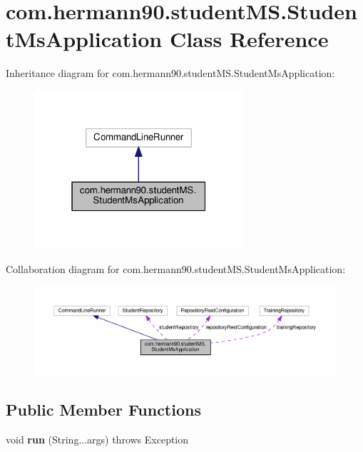\hypertarget{classcom_1_1hermann90_1_1student_m_s_1_1_student_ms_application}{}\section{com.\+hermann90.\+student\+M\+S.\+Student\+Ms\+Application Class Reference}
\label{classcom_1_1hermann90_1_1student_m_s_1_1_student_ms_application}


Inheritance diagram for com.\+hermann90.\+student\+M\+S.\+Student\+Ms\+Application\+:
\nopagebreak
\begin{figure}[H]
\begin{center}
\leavevmode
\includegraphics[width=220pt]{classcom_1_1hermann90_1_1student_m_s_1_1_student_ms_application__inherit__graph}
\end{center}
\end{figure}


Collaboration diagram for com.\+hermann90.\+student\+M\+S.\+Student\+Ms\+Application\+:
\nopagebreak
\begin{figure}[H]
\begin{center}
\leavevmode
\includegraphics[width=350pt]{classcom_1_1hermann90_1_1student_m_s_1_1_student_ms_application__coll__graph}
\end{center}
\end{figure}
\subsection*{Public Member Functions}
\begin{DoxyCompactItemize}
\item 
void {\bfseries run} (String...\+args)  throws Exception \hypertarget{classcom_1_1hermann90_1_1student_m_s_1_1_student_ms_application_a3fb1396d1d61b6015608df13277496f5}{}\label{classcom_1_1hermann90_1_1student_m_s_1_1_student_ms_application_a3fb1396d1d61b6015608df13277496f5}

\end{DoxyCompactItemize}
